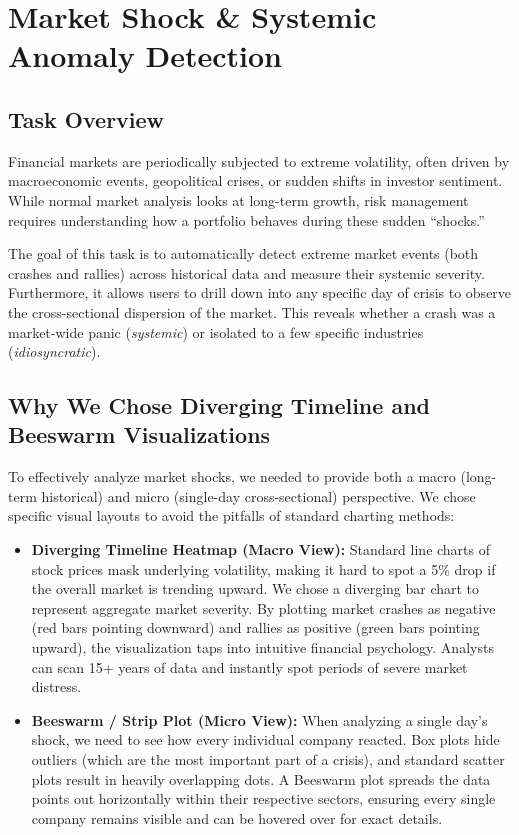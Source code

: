 \documentclass[14pt,a4paper]{extreport}
\begin{document}
\section{Market Shock \& Systemic Anomaly Detection}

\subsection{Task Overview}
Financial markets are periodically subjected to extreme volatility, often
driven by macroeconomic events, geopolitical crises, or sudden shifts in
investor sentiment. While normal market analysis looks at long-term growth,
risk management requires understanding how a portfolio behaves during these
sudden ``shocks.''

The goal of this task is to automatically detect extreme market events
(both crashes and rallies) across historical data and measure their
systemic severity. Furthermore, it allows users to drill down into any
specific day of crisis to observe the cross-sectional dispersion of the
market. This reveals whether a crash was a market-wide panic
(\textit{systemic}) or isolated to a few specific industries
(\textit{idiosyncratic}).

\subsection{Why We Chose Diverging Timeline and Beeswarm Visualizations}
To effectively analyze market shocks, we needed to provide both a macro
(long-term historical) and micro (single-day cross-sectional) perspective.
We chose specific visual layouts to avoid the pitfalls of standard
charting methods:

\begin{itemize}[label=-]
    \item \textbf{Diverging Timeline Heatmap (Macro View):} Standard line
        charts of stock prices mask underlying volatility, making it hard
        to spot a 5\% drop if the overall market is trending upward. We
        chose a diverging bar chart to represent aggregate market severity.
        By plotting market crashes as negative (red bars pointing downward)
        and rallies as positive (green bars pointing upward), the
        visualization taps into intuitive financial psychology. Analysts
        can scan 15+ years of data and instantly spot periods of severe
        market distress.
    \item \textbf{Beeswarm / Strip Plot (Micro View):} When analyzing a
        single day's shock, we need to see how every individual company
        reacted. Box plots hide outliers (which are the most important
        part of a crisis), and standard scatter plots result in heavily
        overlapping dots. A Beeswarm plot spreads the data points out
        horizontally within their respective sectors, ensuring every
        single company remains visible and can be hovered over for exact
        details.
\end{itemize}
\end{document}
